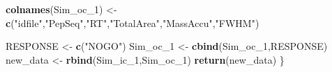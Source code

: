 \documentclass[]{article}
\newenvironment{Shaded}{\begin{snugshade}}{\end{snugshade}}
\newcommand{\KeywordTok}[1]{\textcolor[rgb]{0.13,0.29,0.53}{\textbf{#1}}}
\newcommand{\DecValTok}[1]{\textcolor[rgb]{0.00,0.00,0.81}{#1}}
\newcommand{\StringTok}[1]{\textcolor[rgb]{0.31,0.60,0.02}{#1}}
\newcommand{\NormalTok}[1]{#1}
\begin{document}
\begin{Shaded}
\begin{Highlighting}[]
  \KeywordTok{colnames}\NormalTok{(Sim_oc_}\DecValTok{1}\NormalTok{) <-}\StringTok{ }\KeywordTok{c}\NormalTok{(}\StringTok{"idfile"}\NormalTok{,}\StringTok{"PepSeq"}\NormalTok{,}\StringTok{"RT"}\NormalTok{,}\StringTok{"TotalArea"}\NormalTok{,}\StringTok{"MassAccu"}\NormalTok{,}\StringTok{"FWHM"}\NormalTok{)}
  
\NormalTok{  RESPONSE <-}\StringTok{ }\KeywordTok{c}\NormalTok{(}\StringTok{"NOGO"}\NormalTok{)}
\NormalTok{  Sim_oc_}\DecValTok{1}\NormalTok{ <-}\StringTok{ }\KeywordTok{cbind}\NormalTok{(Sim_oc_}\DecValTok{1}\NormalTok{,RESPONSE)}
\NormalTok{  new_data <-}\StringTok{ }\KeywordTok{rbind}\NormalTok{(Sim_ic_}\DecValTok{1}\NormalTok{,Sim_oc_}\DecValTok{1}\NormalTok{)}
\KeywordTok{return}\NormalTok{(new_data)}
\NormalTok{\}}
\end{Highlighting}
\end{Shaded}
\end{document}
